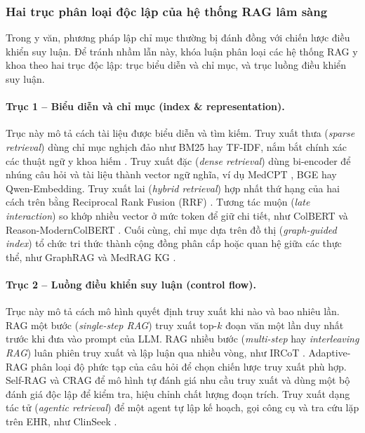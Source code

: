 \subsubsection{Hai trục phân loại độc lập của hệ thống RAG lâm sàng}
Trong y văn, phương pháp lập chỉ mục thường bị đánh đồng với chiến lược điều khiển suy luận. Để tránh nhầm lẫn này, khóa luận phân loại các hệ thống RAG y khoa theo hai trục độc lập: trục biểu diễn và chỉ mục, và trục luồng điều khiển suy luận.

\paragraph{Trục 1 -- Biểu diễn và chỉ mục (index \& representation).}
Trục này mô tả cách tài liệu được biểu diễn và tìm kiếm. Truy xuất thưa (\emph{sparse retrieval}) dùng chỉ mục nghịch đảo như BM25 hay TF-IDF, nắm bắt chính xác các thuật ngữ y khoa hiếm \cite{robertson2009}. Truy xuất đặc (\emph{dense retrieval}) dùng bi-encoder để nhúng câu hỏi và tài liệu thành vector ngữ nghĩa, ví dụ MedCPT \cite{jin2023medcpt}, BGE \cite{myers2025lessons} hay Qwen-Embedding. Truy xuất lai (\emph{hybrid retrieval}) hợp nhất thứ hạng của hai cách trên bằng Reciprocal Rank Fusion (RRF) \cite{xiong2024medrag}. Tương tác muộn (\emph{late interaction}) so khớp nhiều vector ở mức token để giữ chi tiết, như ColBERT và Reason-ModernColBERT \cite{almannaa2026investigating}. Cuối cùng, chỉ mục dựa trên đồ thị (\emph{graph-guided index}) tổ chức tri thức thành cộng đồng phân cấp hoặc quan hệ giữa các thực thể, như GraphRAG \cite{edge2024graphrag} và MedRAG KG \cite{medrag2024}.

\paragraph{Trục 2 -- Luồng điều khiển suy luận (control flow).}
Trục này mô tả cách mô hình quyết định truy xuất khi nào và bao nhiêu lần. RAG một bước (\emph{single-step RAG}) truy xuất top-$k$ đoạn văn một lần duy nhất trước khi đưa vào prompt của LLM. RAG nhiều bước (\emph{multi-step} hay \emph{interleaving RAG}) luân phiên truy xuất và lập luận qua nhiều vòng, như IRCoT \cite{trivedi2023interleaving}. Adaptive-RAG phân loại độ phức tạp của câu hỏi để chọn chiến lược truy xuất phù hợp. Self-RAG và CRAG để mô hình tự đánh giá nhu cầu truy xuất và dùng một bộ đánh giá độc lập để kiểm tra, hiệu chỉnh chất lượng đoạn trích. Truy xuất dạng tác tử (\emph{agentic retrieval}) để một agent tự lập kế hoạch, gọi công cụ và tra cứu lặp trên EHR, như ClinSeek \cite{clinseek2026}.

